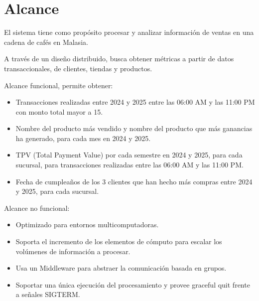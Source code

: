 \section{Alcance}

El sistema tiene como propósito procesar y analizar información de ventas en una cadena de cafés en Malasia.

A través de un diseño distribuido, busca obtener métricas a partir de datos transaccionales, de clientes, tiendas y productos.

Alcance funcional, permite obtener: 
\begin{itemize}
    \item Transacciones realizadas entre 2024 y 2025 entre las 06:00 AM y las 11:00 PM con monto total mayor a 15.
    \item Nombre del producto más vendido y nombre del producto que más ganancias ha generado, para cada mes en 2024 y 2025.
    \item TPV (Total Payment Value) por cada semestre en 2024 y 2025, para cada sucursal, para transacciones realizadas entre las 06:00 AM y las 11:00 PM.
    \item Fecha de cumpleaños de los 3 clientes que han hecho más compras entre 2024 y 2025, para cada sucursal.
\end{itemize}

Alcance no funcional:
\begin{itemize}
    \item Optimizado para entornos multicomputadoras.
    \item Soporta el incremento de los elementos de cómputo para escalar los volúmenes de información a procesar.
    \item Usa un Middleware para abstraer la comunicación basada en grupos.
    \item Soportar una única ejecución del procesamiento y provee graceful quit frente a señales SIGTERM.
\end{itemize}